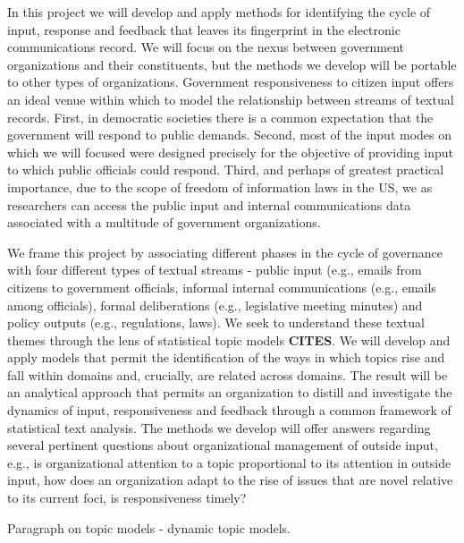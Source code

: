 In this project we will develop and apply methods for identifying the cycle of input, response and feedback that leaves its fingerprint in the electronic communications record. We will focus on the nexus between government organizations and their constituents, but the methods we develop will be portable to other types of organizations. Government responsiveness to citizen input offers an ideal venue within which to model the relationship between streams of textual records. First, in democratic societies there is a common expectation that the government will respond to public demands. Second, most of the input modes on which we will focused were designed precisely for the objective of providing input to which public officials could respond. Third, and perhaps of greatest practical importance, due to the scope of freedom of information laws in the US, we as researchers can access the public input and internal communications data associated with a multitude of government organizations.

We frame this project by associating different phases in the cycle of governance with four different types of textual streams - public input (e.g., emails from citizens to government officials, informal internal communications (e.g., emails among officials), formal deliberations (e.g., legislative meeting minutes) and policy outputs (e.g., regulations, laws). We seek to understand these textual themes through the lens of statistical topic models {\bf CITES}. We will develop and apply models that permit the identification of the ways in which topics rise and fall within domains and, crucially, are related across domains. The result will be an analytical approach that permits an organization to distill and investigate the dynamics of input, responsiveness and feedback through a common framework of statistical text analysis.  The methods we develop will offer answers regarding several pertinent questions about organizational management of outside input, e.g., is organizational attention to a topic proportional to its attention in outside input, how does an organization adapt to the rise of issues that are novel relative to its current foci, is responsiveness timely? 

Paragraph on topic models - dynamic topic models. 

